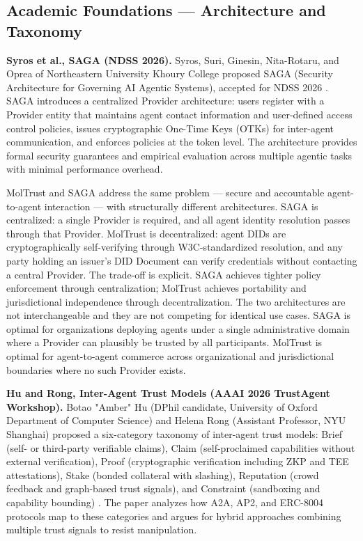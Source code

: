 \subsection{Academic Foundations — Architecture and Taxonomy}

\textbf{Syros et al., SAGA (NDSS 2026).} Syros, Suri, Ginesin, Nita-Rotaru, and Oprea of Northeastern University Khoury College proposed SAGA (Security Architecture for Governing AI Agentic Systems), accepted for NDSS 2026 \cite{ref16_syros}. SAGA introduces a centralized Provider architecture: users register with a Provider entity that maintains agent contact information and user-defined access control policies, issues cryptographic One-Time Keys (OTKs) for inter-agent communication, and enforces policies at the token level. The architecture provides formal security guarantees and empirical evaluation across multiple agentic tasks with minimal performance overhead.


MolTrust and SAGA address the same problem — secure and accountable agent-to-agent interaction — with structurally different architectures. SAGA is centralized: a single Provider is required, and all agent identity resolution passes through that Provider. MolTrust is decentralized: agent DIDs are cryptographically self-verifying through W3C-standardized resolution, and any party holding an issuer's DID Document can verify credentials without contacting a central Provider. The trade-off is explicit. SAGA achieves tighter policy enforcement through centralization; MolTrust achieves portability and jurisdictional independence through decentralization. The two architectures are not interchangeable and they are not competing for identical use cases. SAGA is optimal for organizations deploying agents under a single administrative domain where a Provider can plausibly be trusted by all participants. MolTrust is optimal for agent-to-agent commerce across organizational and jurisdictional boundaries where no such Provider exists.


\textbf{Hu and Rong, Inter-Agent Trust Models (AAAI 2026 TrustAgent Workshop).} Botao "Amber" Hu (DPhil candidate, University of Oxford Department of Computer Science) and Helena Rong (Assistant Professor, NYU Shanghai) proposed a six-category taxonomy of inter-agent trust models: Brief (self- or third-party verifiable claims), Claim (self-proclaimed capabilities without external verification), Proof (cryptographic verification including ZKP and TEE attestations), Stake (bonded collateral with slashing), Reputation (crowd feedback and graph-based trust signals), and Constraint (sandboxing and capability bounding) \cite{ref15_hurong}. The paper analyzes how A2A, AP2, and ERC-8004 protocols map to these categories and argues for hybrid approaches combining multiple trust signals to resist manipulation.


